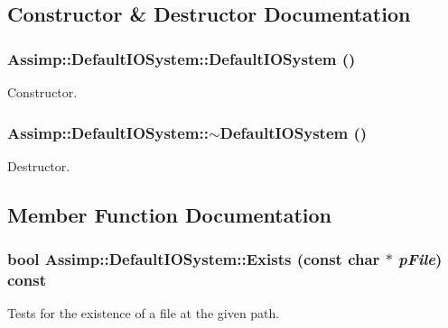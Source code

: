 \subsection{Constructor \& Destructor Documentation}
\hypertarget{class_assimp_1_1_default_i_o_system_8d1b0591ff59be2823f8aaea9fb322e6}{
\subsubsection[DefaultIOSystem]{\setlength{\rightskip}{0pt plus 5cm}Assimp::DefaultIOSystem::DefaultIOSystem ()}}
\label{class_assimp_1_1_default_i_o_system_8d1b0591ff59be2823f8aaea9fb322e6}


Constructor. \hypertarget{class_assimp_1_1_default_i_o_system_25d4b5ee7d9eff449cca8ce5889b91cc}{
\subsubsection[$\sim$DefaultIOSystem]{\setlength{\rightskip}{0pt plus 5cm}Assimp::DefaultIOSystem::$\sim$DefaultIOSystem ()}}
\label{class_assimp_1_1_default_i_o_system_25d4b5ee7d9eff449cca8ce5889b91cc}


Destructor. 

\subsection{Member Function Documentation}
\hypertarget{class_assimp_1_1_default_i_o_system_f8b310025faaed12c6d65c586e935255}{
\subsubsection[Exists]{\setlength{\rightskip}{0pt plus 5cm}bool Assimp::DefaultIOSystem::Exists (const char $\ast$ {\em pFile}) const}}
\label{class_assimp_1_1_default_i_o_system_f8b310025faaed12c6d65c586e935255}


Tests for the existence of a file at the given path. 

